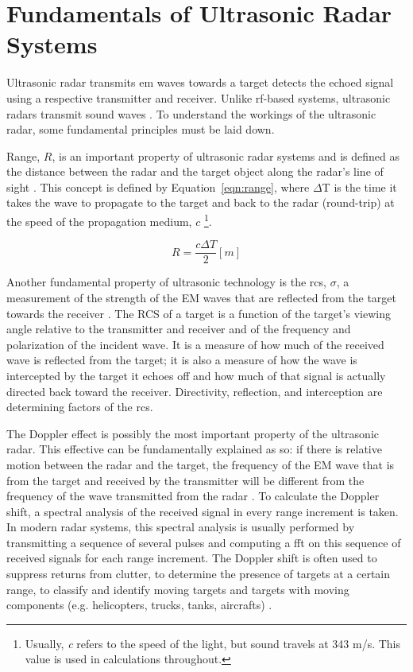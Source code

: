 \documentclass[class=report,11pt,crop=false]{standalone}
\begin{document}
\section{Fundamentals of Ultrasonic Radar Systems}
Ultrasonic radar transmits \gls{em} waves towards a target detects the echoed signal using a respective transmitter and receiver. Unlike \gls{rf}-based systems, ultrasonic radars transmit sound waves \cite{pomr, tripathi}. To understand the workings of the ultrasonic radar, some fundamental principles must be laid down.

Range, $R$, is an important property of ultrasonic radar systems and is defined as the distance between the radar and the target object along the radar's line of sight \cite{pomr}. This concept is defined by Equation~\ref{eqn:range}, where $\Delta$T is the time it takes the wave to propagate to the target and back to the radar (round-trip) at the speed of the propagation medium, $c$ \footnote{Usually, \emph{c} refers to the speed of the light, but sound travels at 343 m/s. This value is used in calculations throughout.}.

\begin{equation}
    R = \frac{c \Delta T}{2} [m]
    \label{eqn:range}
\end{equation}

Another fundamental property of ultrasonic technology is the \gls{rcs}, $\sigma$, a measurement of the strength of the EM waves that are reflected from the target towards the receiver \cite{pomr}. The RCS of a target is a function of the target’s viewing angle relative to the transmitter and receiver and of the frequency and polarization of the incident wave. It is a measure of how much of the received wave is reflected from the target; it is also a measure of how the wave is intercepted by the target it echoes off and how much of that signal is actually directed back toward the receiver. Directivity, reflection, and interception are determining factors of the \gls{rcs}.

The Doppler effect is possibly the most important property of the ultrasonic radar. This effective can be fundamentally explained as so: if there is relative motion between the radar and the target, the frequency of the EM wave that is from the target and received by the transmitter will be different from the frequency of the wave transmitted from the radar \cite{pomr}. To calculate the Doppler shift, a spectral analysis of the received signal in every range increment is taken. In modern radar systems, this spectral analysis is usually performed by transmitting a sequence of several pulses and computing a \gls{fft} on this sequence of received signals for each range increment. The Doppler shift is often used to suppress returns from clutter, to determine the presence of targets at a certain range, to classify and identify moving targets and targets with moving components (e.g. helicopters, trucks, tanks, aircrafts) \cite{pomr}.
\end{document}
